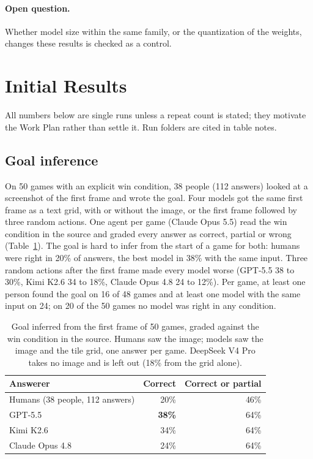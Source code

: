 \documentclass[11pt,a4paper]{article}
\begin{document}
\paragraph{Open question.} Whether model size within the same family, or the
quantization of the weights, changes these results is checked as a control.

\section{Initial Results}
\label{sec:results}

All numbers below are single runs unless a repeat count is stated; they
motivate the Work Plan rather than settle it. Run folders are cited in table
notes.

\subsection{Goal inference}
\label{sec:goal-results}

On 50 games with an explicit win condition, 38 people (112 answers) looked at
a screenshot of the first frame and wrote the goal. Four models got the same
first frame as a text grid, with or without the image, or the first frame
followed by three random actions. One agent per game (Claude Opus 5.5) read
the win condition in the source and graded every answer as correct, partial
or wrong (Table~\ref{tab:goal}). The goal is hard to infer from the start of
a game for both: humans were right in 20\% of answers, the best model in
38\% with the same input. Three random actions after the first frame made
every model worse (GPT-5.5 38 to 30\%, Kimi K2.6 34 to 18\%, Claude Opus 4.8
24 to 12\%). Per game, at least one person found the goal on 16 of 48 games
and at least one model with the same input on 24; on 20 of the 50 games no
model was right in any condition.

\begin{table}[htb]
  \centering\small
  \begin{tabular}{lrr}
    \toprule
    Answerer & Correct & Correct or partial \\
    \midrule
    Humans (38 people, 112 answers) & 20\% & 46\% \\
    GPT-5.5          & \textbf{38\%} & 64\% \\
    Kimi K2.6        & 34\% & 64\% \\
    Claude Opus 4.8  & 24\% & 64\% \\
    \bottomrule
  \end{tabular}
  \caption{Goal inferred from the first frame of 50 games, graded against the
  win condition in the source. Humans saw the image; models saw the image
  and the tile grid, one answer per game. DeepSeek V4 Pro takes no image
  and is left out (18\% from the grid alone).}
  \label{tab:goal}
\end{table}
\end{document}
